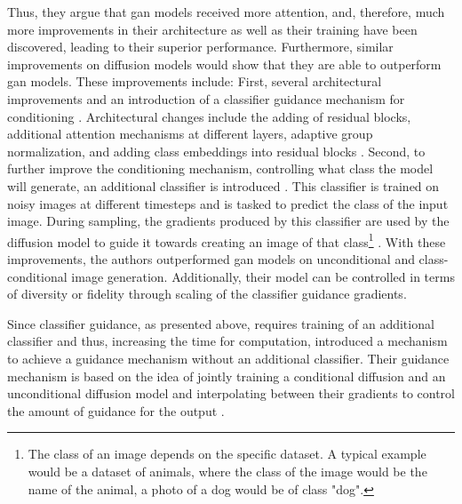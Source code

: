Thus, they argue that \gls{gan} models received more attention, and, therefore, much more improvements in their architecture as well as their training have been discovered, leading to their superior performance.
Furthermore, similar improvements on diffusion models would show that they are able to outperform \gls{gan} models.
These improvements include:
First, several architectural improvements \cite[section 3]{dhariwal2021DiffusionModelsBeat} and an introduction of a classifier guidance mechanism for conditioning \cite[section 4]{dhariwal2021DiffusionModelsBeat}.
Architectural changes include the adding of residual blocks, additional attention mechanisms at different layers, adaptive group normalization, and adding class embeddings into residual blocks \cite{dhariwal2021DiffusionModelsBeat}.
Second, to further improve the conditioning mechanism, \ie controlling what class the \gls{model} will generate, an additional classifier is introduced \cite{dhariwal2021DiffusionModelsBeat}. 
This classifier is trained on noisy images at different timesteps and is tasked to predict the class of the input image.
During sampling, the gradients produced by this classifier are used by the diffusion \gls{model} to guide it towards creating an image of that class\footnote{The class of an image depends on the specific dataset. A typical example would be a dataset of animals, where the class of the image would be the name of the animal, \eg a photo of a dog would be of class "dog".} \cite{dhariwal2021DiffusionModelsBeat}.
With these improvements, the authors outperformed \gls{gan} models on unconditional and class-conditional image generation.
Additionally, their \gls{model} can be controlled in terms of diversity or fidelity through scaling of the classifier guidance gradients.

Since classifier guidance, as presented above, requires training of an additional classifier and thus, increasing the time for computation, \cite{ho2022ClassifierFreeDiffusionGuidance}
introduced a mechanism to achieve a guidance mechanism without an additional classifier.  
Their guidance mechanism is based on the idea of jointly training a conditional diffusion and an unconditional diffusion \gls{model} and interpolating between their gradients to control the amount of guidance for the output \cite{ho2022ClassifierFreeDiffusionGuidance}.

